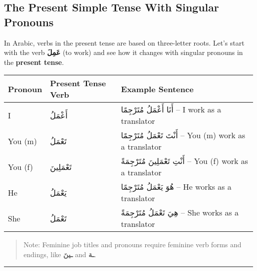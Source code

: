\documentclass[
  a4paper,
  DIV=11,
  numbers=noendperiod]{scrartcl}
\begin{document}
\subsection{The Present Simple Tense With Singular
Pronouns}\label{the-present-simple-tense-with-singular-pronouns}

In Arabic, verbs in the present tense are based on three-letter roots.
Let's start with the verb \textbf{عَمِلَ} (to work) and see how it changes
with singular pronouns in the \textbf{present tense}.

\begin{longtable}[]{@{}
  >{\raggedright\arraybackslash}p{}
  >{\raggedright\arraybackslash}p{}
  >{\raggedright\arraybackslash}p{}@{}}
\toprule\noalign{}
\begin{minipage}[b]{\linewidth}\raggedright
Pronoun
\end{minipage} & \begin{minipage}[b]{\linewidth}\raggedright
Present Tense Verb
\end{minipage} & \begin{minipage}[b]{\linewidth}\raggedright
Example Sentence
\end{minipage} \\
\midrule\noalign{}
\endhead
\bottomrule\noalign{}
\endlastfoot
I & أَعْمَلُ & أَنَا أَعْمَلُ مُتَرْجِمًا -- I work as a translator \\
You (m) & تَعْمَلُ & أَنْتَ تَعْمَلُ مُتَرْجِمًا -- You (m) work as a translator \\
You (f) & تَعْمَلِينَ & أَنْتِ تَعْمَلِينَ مُتَرْجِمَةً -- You (f) work as a translator \\
He & يَعْمَلُ & هُوَ يَعْمَلُ مُتَرْجِمًا -- He works as a translator \\
She & تَعْمَلُ & هِيَ تَعْمَلُ مُتَرْجِمَةً -- She works as a translator \\
\end{longtable}

\begin{quote}
Note: Feminine job titles and pronouns require feminine verb forms and
endings, like \textbf{ـينَ} and \textbf{ـة}.
\end{quote}

\begin{center}\rule{0.5\linewidth}{0.5pt}\end{center}
\end{document}
